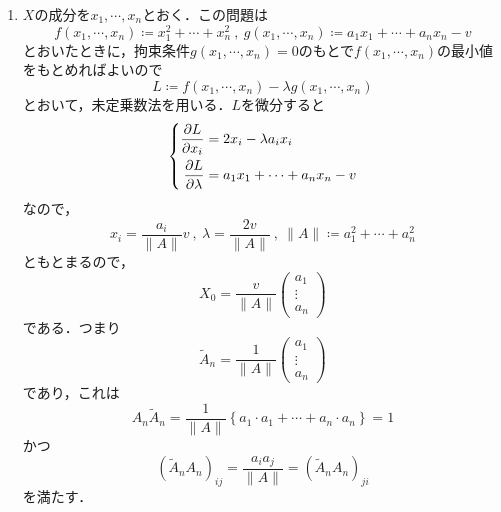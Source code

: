 \documentclass[a4paper,pdflatex,ja=standard]{bxjsarticle}
\begin{document}
\begin{enumerate}
  \item 
  $X$の成分を$x_{1},\cdots,x_{n}$とおく．この問題は
  \begin{equation}
    f(x_{1},\cdots,x_{n})
    \coloneqq
    x_{1}^2+\cdots+x_{n}^2
    \ ,\ 
    g(x_{1},\cdots,x_{n})
    \coloneqq
    a_{1}x_{1}+\cdots+a_{n}x_{n}-v
  \end{equation}
  とおいたときに，拘束条件$g(x_{1},\cdots,x_{n})=0$のもとで$f(x_{1},\cdots,x_{n})$の最小値をもとめればよいので
  \begin{equation}
    L
    \coloneqq
    f(x_{1},\cdots,x_{n})
    -
    \lambda
    g(x_{1},\cdots,x_{n})
  \end{equation}
  とおいて，未定乗数法を用いる．$L$を微分すると
  \begin{equation}
    \left\{
    \begin{alignedat}{1}
      \pdv{L}{x_{i}}
      &=
      2x_{i}-\lambda a_{i}x_{i}
      \\
      \pdv{L}{\lambda}
      &=
      a_{1}x_{1}+\cdots+a_{n}x_{n}-v
    \end{alignedat}
    \right.
  \end{equation}
  なので，
  \begin{equation}
    x_{i}
    =
    \frac{a_{i}}{\|A\|}v
    \ ,\ 
    \lambda
    =
    \frac{2v}{\|A\|}
    \ ,\ 
    \|A\|
    \coloneqq
    a_{1}^{2}+\cdots+a_{n}^{2}
  \end{equation}
  ともとまるので，
  \begin{equation}
    X_{0}
    =
    \frac{v}{\|A\|}
    \begin{pmatrix}
      a_{1} \\
      \vdots \\
      a_{n}
    \end{pmatrix}
  \end{equation}
  である．つまり
  \begin{equation}
    \tilde{A}_{n}
    =
    \frac{1}{\|A\|}
    \begin{pmatrix}
      a_{1} \\
      \vdots \\
      a_{n}
    \end{pmatrix}
  \end{equation}
  であり，これは
  \begin{equation}
    A_{n}\tilde{A}_{n}
    =
    \frac{1}{\|A\|}\left\{  
      a_{1}\cdot a_{1}
      +
      \cdots
      +
      a_{n}\cdot a_{n}
    \right\}
    =
    1
  \end{equation}
  かつ
  \begin{equation}
    (\tilde{A}_{n}A_{n})_{ij}
    =
    \frac{a_{i}a_{j}}{\|A\|} 
    =
    (\tilde{A}_{n}A_{n})_{ji}
  \end{equation}
  を満たす．


\end{enumerate}
\end{document}
